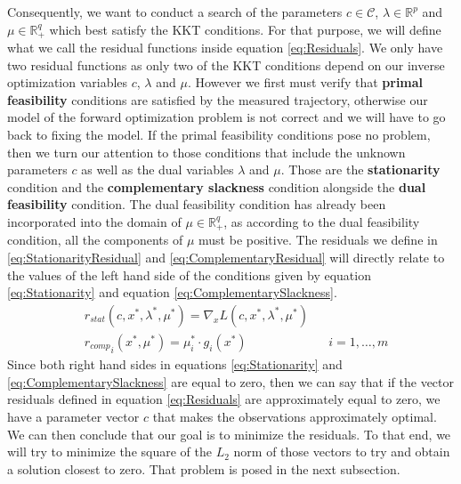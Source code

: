 \documentclass[12pt, a4paper]{article}
\begin{document}
Consequently, we want to conduct a search of the parameters \( c \in \mathcal{C}\), \(\lambda \in \mathbb{R}^p\) and \(\mu \in \mathbb{R}_+^q\) which best satisfy the KKT conditions. For that purpose, we will define what we call the residual functions inside equation \eqref{eq:Residuals}. We only have two residual functions as only two of the KKT conditions depend on our inverse optimization variables $c$, $\lambda$ and $\mu$. However we first must verify that \textbf{primal feasibility} conditions are satisfied by the measured trajectory, otherwise our model of the forward optimization problem is not correct and we will have to go back to fixing the model. If the primal feasibility conditions pose no problem, then we turn our attention to those conditions that include the unknown parameters \(c\) as well as the dual variables \(\lambda\) and \(\mu\). Those are the \textbf{stationarity} condition and the \textbf{complementary slackness} condition alongside the \textbf{dual feasibility} condition. The dual feasibility condition has already been incorporated into the domain of \( \mu \in \mathbb{R}^q_+\), as according to the dual feasibility condition, all the components of $\mu$ must be positive. The residuals we define in \eqref{eq:StationarityResidual} and \eqref{eq:ComplementaryResidual} will directly relate to the values of the left hand side of the conditions given by equation \eqref{eq:Stationarity} and equation \eqref{eq:ComplementarySlackness}.
\begin{subequations} \label{eq:Residuals}
\begin{align}
    &r_{stat}(c, x^*, \lambda^*, \mu^*) = \nabla_x L(c, x^*, \lambda^*, \mu^*) & & \label{eq:StationarityResidual}\\
    &{r_{comp}}_i(x^*, \mu^*) = \mu_i^* \cdot g_i(x^*) & & i = 1,\dots, m \label{eq:ComplementaryResidual}
\end{align}
\end{subequations}
Since both right hand sides in equations \eqref{eq:Stationarity} and \eqref{eq:ComplementarySlackness} are equal to zero, then we can say that if the vector residuals defined in equation \eqref{eq:Residuals} are approximately equal to zero, we have a parameter vector \( c\) that makes the observations approximately optimal. We can then conclude that our goal is to minimize the residuals. To that end, we will try to minimize the square of the \( L_2\) norm of those vectors to try and obtain a solution closest to zero. That problem is posed in the next subsection.\par
\end{document}
